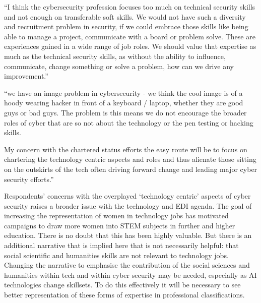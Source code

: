 \documentclass[
  a4paper,
]{book}
\begin{document}
\begin{tcolorbox}[enhanced jigsaw, leftrule=.75mm, colframe=quarto-callout-note-color-frame, opacityback=0, breakable, left=2mm, rightrule=.15mm, bottomrule=.15mm, colback=white, arc=.35mm, toprule=.15mm]

``I think the cybersecurity profession focuses too much on technical
security skills and not enough on transferable soft skills. We would not
have such a diversity and recruitment problem in security, if we could
embrace those skills like being able to manage a project, communicate
with a board or problem solve. These are experiences gained in a wide
range of job roles. We should value that expertise as much as the
technical security skills, as without the ability to influence,
communicate, change something or solve a problem, how can we drive any
improvement.''

\end{tcolorbox}

\begin{tcolorbox}[enhanced jigsaw, leftrule=.75mm, colframe=quarto-callout-note-color-frame, opacityback=0, breakable, left=2mm, rightrule=.15mm, bottomrule=.15mm, colback=white, arc=.35mm, toprule=.15mm]

``we have an image problem in cybersecurity - we think the cool image is
of a hoody wearing hacker in front of a keyboard / laptop, whether they
are good guys or bad guys. The problem is this means we do not encourage
the broader roles of cyber that are so not about the technology or the
pen testing or hacking skills.

My concern with the chartered status efforts the easy route will be to
focus on chartering the technology centric aspects and roles and thus
alienate those sitting on the outskirts of the tech often driving
forward change and leading major cyber security efforts.''

\end{tcolorbox}

Respondents' concerns with the overplayed `technology centric' aspects
of cyber security raises a broader issue with the technology and EDI
agenda. The goal of increasing the representation of women in technology
jobs has motivated campaigns to draw more women into STEM subjects in
further and higher education. There is no doubt that this has been
highly valuable. But there is an additional narrative that is implied
here that is not necessarily helpful: that social scientific and
humanities skills are not relevant to technology jobs. Changing the
narrative to emphasise the contribution of the social sciences and
humanities within tech and within cyber security may be needed,
especially as AI technologies change skillsets. To do this effectively
it will be necessary to see better representation of these forms of
expertise in professional classifications.
\end{document}
